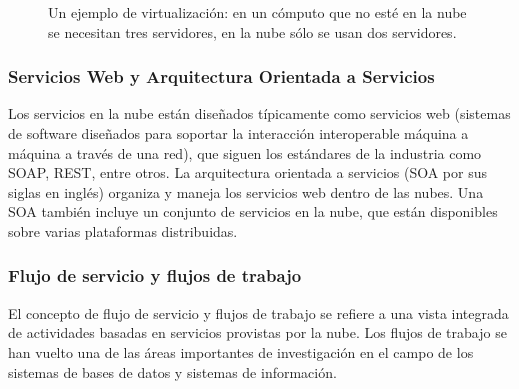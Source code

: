 \begin{figure}[ht]
\centering
\capstart

\noindent{}
\caption{Un ejemplo de virtualización: en un cómputo que no esté en la nube se necesitan tres servidores, en la nube sólo se usan dos servidores.}\label{\detokenize{chapter_one/cloud_computing:c-computing-virtualization}}\end{figure}


\subsubsection{Servicios Web y Arquitectura Orientada a Servicios}
\label{\detokenize{chapter_one/cloud_computing:servicios-web-y-arquitectura-orientada-a-servicios}}
Los servicios en la nube están diseñados típicamente como servicios web (sistemas
de software diseñados para soportar la interacción interoperable máquina a máquina
a través de una red), que siguen los estándares de la industria como SOAP, REST, entre
otros. La arquitectura orientada a servicios (SOA por sus siglas en inglés) organiza y maneja
los servicios web dentro de las nubes. Una SOA también incluye un conjunto
de servicios en la nube, que están disponibles sobre varias plataformas distribuidas.


\subsubsection{Flujo de servicio y flujos de trabajo}
\label{\detokenize{chapter_one/cloud_computing:flujo-de-servicio-y-flujos-de-trabajo}}
El concepto de flujo de servicio y flujos de trabajo se refiere a una
vista integrada de actividades basadas en servicios provistas por la nube.
Los flujos de trabajo se han vuelto una de las áreas importantes
de investigación en el campo de los sistemas de bases de datos
y sistemas de información.


